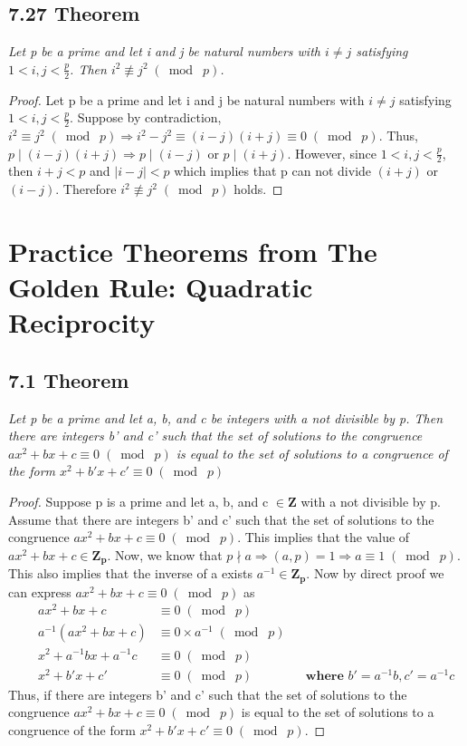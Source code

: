 \documentclass{article}
\begin{document}
\subsection*{7.27 Theorem} 
\quad \textit{Let p be a prime and let i and j be natural numbers with $i \neq j$ satisfying $1 < i,j < \frac{p}{2}$. Then $i^2 \not\equiv j^2 \;(\bmod\; p)$.}

\begin{proof}
Let p be a prime and let i and j be natural numbers with $i \neq j$ satisfying $1 < i,j < \frac{p}{2}$. Suppose by contradiction, $i^2 \equiv j^2 \;(\bmod\; p) \Longrightarrow i^2 - j^2 \equiv (i-j)(i+j) \equiv 0\;(\bmod\; p)$. Thus, $p \mid (i-j)(i+j) \Longrightarrow p \mid (i-j)$ or $p \mid (i+j)$. However, since $1 < i,j < \frac{p}{2}$, then $i+j < p$ and $|i-j| < p$ which implies that p can not divide $(i+j)$ or $(i-j)$. Therefore $i^2 \not\equiv j^2 \;(\bmod\; p)$ holds.
\end{proof}

\section*{Practice Theorems from The Golden Rule: Quadratic Reciprocity}

\subsection*{7.1 Theorem} 
\quad \textit{Let p be a prime and let a, b, and c be integers with a not divisible by p. Then there are integers b' and c' such that the set of solutions to the congruence $ax^2 + bx + c \equiv 0 \;(\bmod\; p)$ is equal to the set of solutions to a congruence of the form $x^2+b'x+c' \equiv 0 \;(\bmod\; p)$}

\begin{proof}
Suppose p is a prime and let a, b, and c $\in \mathbf{Z}$ with a not divisible by p. Assume that there are integers b' and c' such that the set of solutions to the congruence $ax^2 + bx + c \equiv 0 \;(\bmod\; p)$. This implies that the value of $ax^2 + bx + c \in \mathbf{Z_p}$. Now, we know that $p \nmid a \Longrightarrow (a,p) = 1 \Longrightarrow a \equiv 1 \;(\bmod\; p)$. This also implies that the inverse of a exists $a^{-1} \in \mathbf{Z_p}$. Now by direct proof we can express $ax^2 + bx + c \equiv 0 \;(\bmod\; p)$ as
\begin{align*}
    && ax^2 + bx + c &\equiv 0 \;(\bmod\; p) &&\\
    && a^{-1}(ax^2 + bx + c) &\equiv 0\times a^{-1} \;(\bmod\; p) &&\\
    && x^2 + a^{-1}bx + a^{-1}c &\equiv 0 \;(\bmod\; p) &&\\
    && x^2 +b'x + c' &\equiv 0 \;(\bmod\; p) && \textbf{where $b' = a^{-1}b, c' = a^{-1}c$}
\end{align*}
Thus, if there are integers b' and c' such that the set of solutions to the congruence $ax^2 + bx + c \equiv 0 \;(\bmod\; p)$ is equal to the set of solutions to a congruence of the form $x^2+b'x+c' \equiv 0 \;(\bmod\; p)$.
\end{proof}
\end{document}
